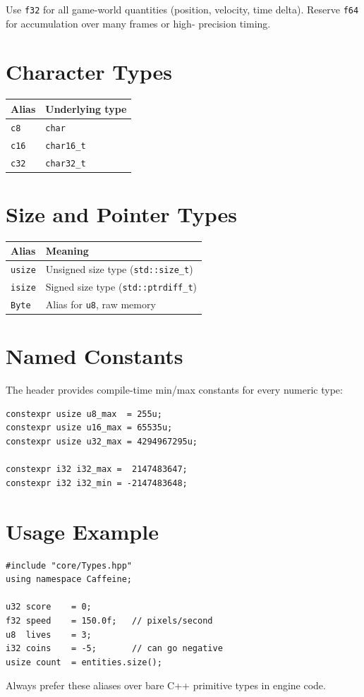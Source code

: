 Use \texttt{f32} for all game-world quantities (position, velocity, time
delta). Reserve \texttt{f64} for accumulation over many frames or high-
precision timing.

\section{Character Types}

\begin{longtable}{ll}
\toprule
\textbf{Alias} & \textbf{Underlying type} \\
\midrule
\texttt{c8}  & \texttt{char} \\
\texttt{c16} & \texttt{char16\_t} \\
\texttt{c32} & \texttt{char32\_t} \\
\bottomrule
\end{longtable}

\section{Size and Pointer Types}

\begin{longtable}{ll}
\toprule
\textbf{Alias} & \textbf{Meaning} \\
\midrule
\texttt{usize} & Unsigned size type (\texttt{std::size\_t}) \\
\texttt{isize} & Signed size type (\texttt{std::ptrdiff\_t}) \\
\texttt{Byte}  & Alias for \texttt{u8}, raw memory \\
\bottomrule
\end{longtable}

\section{Named Constants}

The header provides compile-time min/max constants for every numeric type:

\begin{lstlisting}
constexpr usize u8_max  = 255u;
constexpr usize u16_max = 65535u;
constexpr usize u32_max = 4294967295u;

constexpr i32 i32_max =  2147483647;
constexpr i32 i32_min = -2147483648;
\end{lstlisting}

\section{Usage Example}

\begin{lstlisting}
#include "core/Types.hpp"
using namespace Caffeine;

u32 score    = 0;
f32 speed    = 150.0f;   // pixels/second
u8  lives    = 3;
i32 coins    = -5;       // can go negative
usize count  = entities.size();
\end{lstlisting}

Always prefer these aliases over bare C++ primitive types in engine code.
